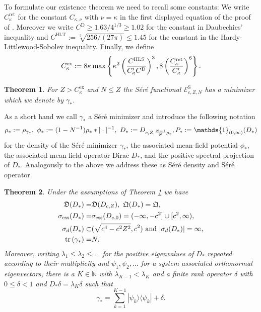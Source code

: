 \documentclass[a4paper]{amsart}
\newtheorem{theorem}{Theorem}
\def\tr{{\rm tr \,}}
\def\1{{\mathds{1}}}
\def\cE{{\mathcal E}}
\def\gD{\mathfrak{D}}
\def\gQ{\mathfrak{Q}}
\def\nz{{\mathbb N}}
\begin{document}
To formulate our existence theorem we need to recall some constants:
We write $C^\mathrm{ret}_\kappa$ for the constant $C_{\kappa,\nu}$
with $\nu=\kappa$ in the first displayed equation of the proof of
\cite[Lemma 17]{Fournaisetal2020}. Moreover we write
$C^\mathrm{D}\geq 1.63/4^{1/3}\geq 1.02$ for the constant in
Daubechies' inequality \cite[Inequality (3.4)]{Daubechies1983} and
$C^\mathrm{HLT}:= \sqrt[3]{256/(27\pi)}\leq 1.45$ for the constant in
the Hardy-Littlewood-Sobolev inequality. Finally, we define
  \begin{equation}\label{eq:C-ex}
    C_\kappa^\mathrm{ex}:= 8\kappa\max\left\{\kappa^2\left({ C^{\rm HLS}\over C_\kappa' C^{\rm D}}\right)^3, 8\left({ C_{\kappa}^{\rm ret}\over C_\kappa'}\right)^6\right\}.
  \end{equation}

\begin{theorem}\label{th:DF-existence}
  For $Z> C_\kappa^\mathrm{ex}$ and $N\leq Z$ the S\'er\'e functional
  $\cE^\mathrm{S}_{c,Z,N}$ has a minimizer which we denote by
  $\gamma_*$.
\end{theorem}
As a short hand we call $\gamma_*$ a S\'er\'e minimizer and introduce
the following notation
\begin{equation}
  \label{*}
  \rho_*:=\rho_{\gamma_*},\ \phi_*:=(1-N^{-1})\rho_**|\cdot|^{-1},\ D_*:=D_{c,Z,{N-1\over N}\rho_*}, P_*:=\1_{(0,\infty)}(D_*)
\end{equation}
for the density of the S\'er\'e minimizer $\gamma_*$, the associated
mean-field potential $\phi_*$, the associated mean-field operator Dirac
$D_*$, and the positive spectral projection of $D_*$. Analogously to
the above we address these as S\'er\'e density and S\'er\'e operator.
\begin{theorem}
  \label{th:property}
  Under the assumptions of Theorem \ref{th:DF-existence} we have
  \begin{align}
      \gD(D_*)=&\gD(D_{c,Z}),\ \gQ(D_*)=\gQ,\\
       \sigma_\mathrm{ess}(D_*)=&\sigma_\mathrm{ess}(D_{c,0}) = (-\infty,-c^2]\cup[c^2,\infty),\\
    \label{discrete}
    \sigma_d(D_*) \subset&(\sqrt{c^4-c^2Z^2},c^2)\ \text{and}\ |\sigma_d(D_*)|=\infty,\\
    \tr(\gamma_*)=&N.
  \end{align}
  Moreover, writing $\lambda_1\leq\lambda_2\leq...$ for the positive
  eigenvalues of $D_*$ repeated according to their multiplicity and 
  $\psi_1, \psi_2,...$ for a system associated orthonormal eigenvectors,
  there is a $K\in \nz$ with $\lambda_{K-1}<\lambda_K$ and a finite
  rank operator $\delta$ with $0\leq \delta<1$ and
  $D_*\delta=\lambda_K\delta$ such that
\begin{equation}\label{eq:gamma}
  \gamma_*= \sum_{k=1}^{K-1}|\psi_k\rangle\langle\psi_k|
  +\delta.
  \end{equation} 
\end{theorem}
\end{document}
